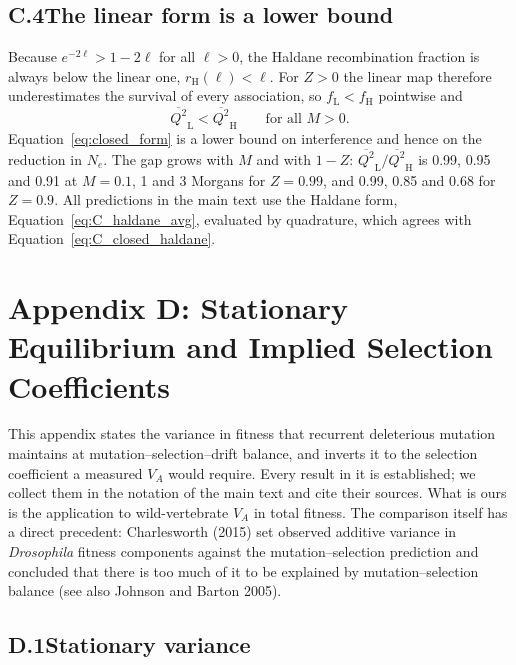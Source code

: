 \documentclass[12pt]{article}
\begin{document}
\subsection*{C.4\quad The linear form is a lower bound}

Because $e^{-2\ell} > 1 - 2\ell$ for all $\ell > 0$, the Haldane recombination fraction is always below the linear one, $r_\text{H}(\ell) < \ell$. For $Z > 0$ the linear map therefore underestimates the survival of every association, so $f_\text{L} < f_\text{H}$ pointwise and
\begin{equation}
    \overline{Q^2}_\text{L} < \overline{Q^2}_\text{H} \qquad \text{for all } M > 0.
\end{equation}
Equation~\eqref{eq:closed_form} is a lower bound on interference and hence on the reduction in $N_e$. The gap grows with $M$ and with $1-Z$: $\overline{Q^2}_\text{L}/\overline{Q^2}_\text{H}$ is 0.99, 0.95 and 0.91 at $M = 0.1$, 1 and 3 Morgans for $Z = 0.99$, and 0.99, 0.85 and 0.68 for $Z = 0.9$. All predictions in the main text use the Haldane form, Equation~\eqref{eq:C_haldane_avg}, evaluated by quadrature, which agrees with Equation~\eqref{eq:C_closed_haldane}.

\section{Appendix D: Stationary Equilibrium and Implied Selection Coefficients}\label{app:msdbapp}

This appendix states the variance in fitness that recurrent deleterious mutation maintains at mutation--selection--drift balance, and inverts it to the selection coefficient a measured $V_A$ would require. Every result in it is established; we collect them in the notation of the main text and cite their sources. What is ours is the application to wild-vertebrate $V_A$ in total fitness. The comparison itself has a direct precedent: Charlesworth (2015) set observed additive variance in \emph{Drosophila} fitness components against the mutation--selection prediction and concluded that there is too much of it to be explained by mutation--selection balance (see also Johnson and Barton 2005).

\subsection*{D.1\quad Stationary variance}
\end{document}
